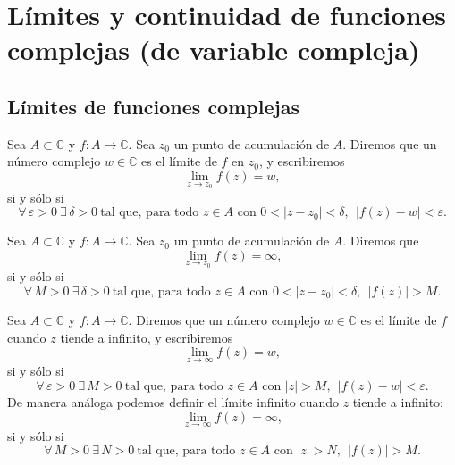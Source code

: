 
\section{Límites y continuidad de funciones complejas (de variable compleja)}
\subsection{Límites de funciones complejas}

\begin{definición}
    Sea $A \subset \mathbb{C}$ y $f : A \to \mathbb{C}$.  
    Sea $z_0$ un punto de acumulación de $A$. Diremos que un número complejo $w \in \mathbb{C}$ es el límite de $f$ en $z_0$, y escribiremos
    \[
        \lim_{z \to z_0} f(z) = w,
    \]
    si y sólo si
    \[
        \forall \, \varepsilon > 0 \ \exists \, \delta > 0 \ \text{tal que, para todo } z \in A \text{ con } 0 < |z-z_0| < \delta, 
        \ \ |f(z) - w| < \varepsilon.
    \]
\end{definición}

\begin{definición}
    Sea $A \subset \mathbb{C}$ y $f : A \to \mathbb{C}$.  
    Sea $z_0$ un punto de acumulación de $A$. Diremos que
    \[
        \lim_{z \to z_0} f(z) = \infty,
    \]
    si y sólo si
    \[
        \forall \, M > 0 \ \exists \, \delta > 0 \ \text{tal que, para todo } z \in A \text{ con } 0 < |z-z_0| < \delta, 
        \ \ |f(z)| > M.
    \]
\end{definición}


\begin{definición}
    Sea $A \subset \mathbb{C}$ y $f : A \to \mathbb{C}$.  
    Diremos que un número complejo $w \in \mathbb{C}$ es el límite de $f$ cuando $z$ tiende a infinito, y escribiremos
    \[
        \lim_{z \to \infty} f(z) = w,
    \]
    si y sólo si
    \[
        \forall \, \varepsilon > 0 \ \exists \, M > 0 \ \text{tal que, para todo } z \in A \text{ con } |z| > M, 
        \ \ |f(z) - w| < \varepsilon.
    \]
    De manera análoga podemos definir el límite infinito cuando $z$ tiende a infinito:
    \[
        \lim_{z \to \infty} f(z) = \infty,
    \]
    si y sólo si
    \[
        \forall \, M > 0 \ \exists \, N > 0 \ \text{tal que, para todo } z \in A \text{ con } |z| > N, 
        \ \ |f(z)| > M.
    \]
\end{definición}

